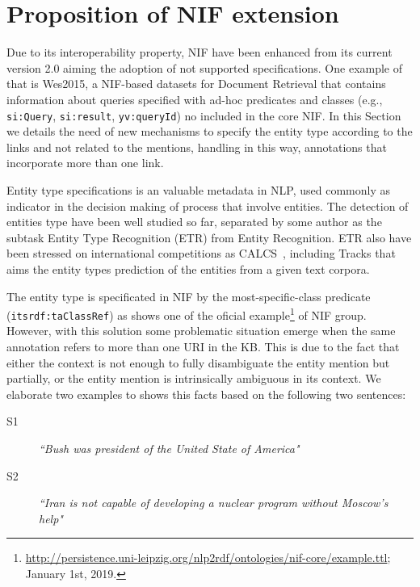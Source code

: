 \documentclass{llncs}
\begin{document}
\section{Proposition of NIF extension}
\label{sec:nifmod}

Due to its interoperability property, NIF have been enhanced from its current version 2.0 aiming the adoption of not supported specifications. One example of that is Wes2015, a NIF-based datasets for Document Retrieval that contains information about queries specified with ad-hoc predicates and classes (e.g., \texttt{si:Query}, \texttt{si:result}, \texttt{yv:queryId}) no included in the core NIF. In this Section we details the need of new mechanisms to specify the entity type according to the links and not related to the mentions, handling in this way, annotations that incorporate more than one link.


Entity type specifications is an valuable metadata in NLP, used commonly as indicator in the decision making of process that involve entities. The detection of entities type have been well studied so far, separated by some author as the subtask Entity Type Recognition (ETR) from Entity Recognition. ETR also have been stressed on international competitions as CALCS~\cite{calcs2018shtask}, including Tracks that aims the entity types prediction of the entities from a given text corpora. 

The entity type is specificated in NIF by the most-specific-class predicate (\texttt{itsrdf:taClassRef}) as shows one of the oficial example\footnote{\url{http://persistence.uni-leipzig.org/nlp2rdf/ontologies/nif-core/example.ttl}; January 1st, 2019.} of NIF group. However, with this solution some problematic situation emerge when the same annotation refers to more than one URI in the KB. This is due to the fact that either the context is not enough to fully disambiguate the entity mention but partially, or the entity mention is intrinsically ambiguous in its context. We elaborate two examples to shows this facts based on the following two sentences:

\begin{description}
\item[S1] \textit{``Bush was president of the United State of America"}
\item[S2] \textit{``Iran is not capable of developing a nuclear program without Moscow's help"}
\end{description}
\end{document}
